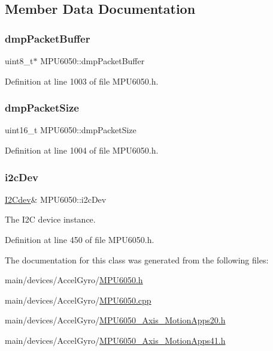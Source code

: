 \subsection{Member Data Documentation}
\mbox{\label{classMPU6050_aabbe31187ccf2d74a0539b9dc2927e19}} 
\subsubsection{\texorpdfstring{dmpPacketBuffer}{dmpPacketBuffer}}
{\footnotesize\ttfamily uint8\+\_\+t$\ast$ M\+P\+U6050\+::dmp\+Packet\+Buffer}



Definition at line 1003 of file M\+P\+U6050.\+h.

\mbox{\label{classMPU6050_a99f1e24e65565db5771435c8f2a2a09c}} 
\subsubsection{\texorpdfstring{dmpPacketSize}{dmpPacketSize}}
{\footnotesize\ttfamily uint16\+\_\+t M\+P\+U6050\+::dmp\+Packet\+Size}



Definition at line 1004 of file M\+P\+U6050.\+h.

\mbox{\label{classMPU6050_aae191481b6ec5841600b572b37861fe3}} 
\subsubsection{\texorpdfstring{i2cDev}{i2cDev}}
{\footnotesize\ttfamily \mbox{\hyperlink{classI2Cdev}{I2\+Cdev}}\& M\+P\+U6050\+::i2c\+Dev}

The I2C device instance. 

Definition at line 450 of file M\+P\+U6050.\+h.



The documentation for this class was generated from the following files\+:\begin{DoxyCompactItemize}
\item 
main/devices/\+Accel\+Gyro/\mbox{\hyperlink{MPU6050_8h}{M\+P\+U6050.\+h}}\item 
main/devices/\+Accel\+Gyro/\mbox{\hyperlink{MPU6050_8cpp}{M\+P\+U6050.\+cpp}}\item 
main/devices/\+Accel\+Gyro/\mbox{\hyperlink{MPU6050__6Axis__MotionApps20_8h}{M\+P\+U6050\+\_\+Axis\+\_\+\+Motion\+Apps20.\+h}}\item 
main/devices/\+Accel\+Gyro/\mbox{\hyperlink{MPU6050__9Axis__MotionApps41_8h}{M\+P\+U6050\+\_\+Axis\+\_\+\+Motion\+Apps41.\+h}}\end{DoxyCompactItemize}
